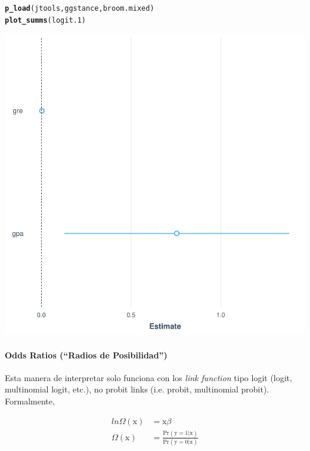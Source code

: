 \documentclass[onesided]{article}\usepackage[]{graphicx}\usepackage[]{color}
\makeatletter
\def\maxwidth{ %
  \ifdim\Gin@nat@width>\linewidth
    \linewidth
  \else
    \Gin@nat@width
  \fi
}
\newcommand{\hlstd}[1]{\textcolor[rgb]{0.345,0.345,0.345}{#1}}%
\newcommand{\hlkwd}[1]{\textcolor[rgb]{0.737,0.353,0.396}{\textbf{#1}}}%
\newenvironment{kframe}{%
 \def\at@end@of@kframe{}%
 \ifinner\ifhmode%
  \def\at@end@of@kframe{\end{minipage}}%
  \begin{minipage}{\columnwidth}%
 \fi\fi%
 \def\FrameCommand##1{\hskip\@totalleftmargin \hskip-\fboxsep
 \colorbox{shadecolor}{##1}\hskip-\fboxsep
     \hskip-\linewidth \hskip-\@totalleftmargin \hskip\columnwidth}%
 \MakeFramed {\advance\hsize-\width
   \@totalleftmargin\z@ \linewidth\hsize
   \@setminipage}}%
 {\par\unskip\endMakeFramed%
 \at@end@of@kframe}
\newenvironment{knitrout}{}{} %
\makeatother
\begin{document}
\begin{knitrout}
\color{fgcolor}\begin{kframe}
\begin{alltt}
\hlkwd{p_load}\hlstd{(jtools,ggstance,broom.mixed)}
\hlkwd{plot_summs}\hlstd{(logit.1)}
\end{alltt}
\end{kframe}

{\centering \includegraphics[width=\maxwidth]{figure/ci:plot-1} 

}



\end{knitrout}

\paragraph{Odds Ratios (``Radios de Posibilidad'')}

Esta manera de interpretar solo funciona con los \emph{link function} tipo logit (logit, multinomial logit, etc.), no probit links (i.e. probit, multinomial probit). Formalmente, 

\begin{equation}\label{odd:ratio}
\begin{split}
ln \Omega(\text{x}) & = \text{x}\beta \\
\Omega(\text{x}) & = \frac{\text{Pr}(\text{y}=1 | \text{x})}{\text{Pr}(\text{y}=0 | \text{x})} 
\end{split}
\end{equation}
\end{document}
